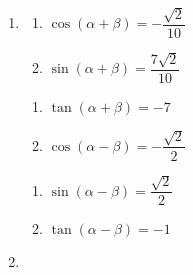 \begin{enumerate}

\setcounter{enumi}{\value{HW}}

\item \begin{multicols}{2}

\begin{enumerate}

\item  $\cos(\alpha + \beta) = -\dfrac{\sqrt{2}}{10}$
\item  $\sin(\alpha + \beta) = \dfrac{7\sqrt{2}}{10}$

\setcounter{HWindent}{\value{enumii}}

\end{enumerate}

\end{multicols}

\begin{multicols}{2}

\begin{enumerate}

\setcounter{enumii}{\value{HWindent}}

\item  $\tan(\alpha + \beta) = -7$ 
\item  $\cos(\alpha - \beta)= -\dfrac{\sqrt{2}}{2}$

\setcounter{HWindent}{\value{enumii}}

\end{enumerate}

\end{multicols}

\begin{multicols}{2}

\begin{enumerate}

\setcounter{enumii}{\value{HWindent}}

\item  $\sin(\alpha - \beta) = \dfrac{\sqrt{2}}{2}$
\item  $\tan(\alpha - \beta) = -1$ 

\end{enumerate}

\end{multicols}

\item \begin{multicols}{2}

\begin{enumerate}


\end{enumerate}
\end{multicols}
\end{enumerate}
